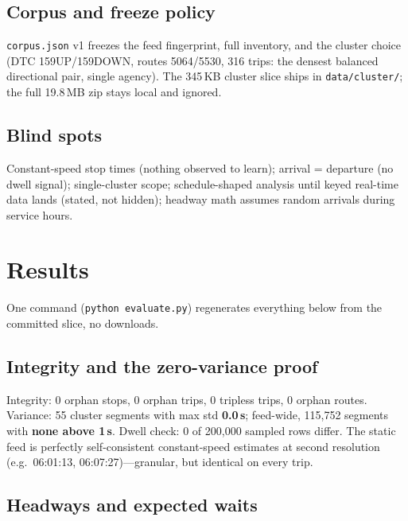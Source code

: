 \documentclass[11pt,a4paper]{article}
\begin{document}
\subsection{Corpus and freeze policy}

\verb!corpus.json! v1 freezes the feed fingerprint, full inventory, and the cluster choice (DTC 159UP/159DOWN, routes 5064/5530, 316 trips: the densest balanced directional pair, single agency). The 345\,KB cluster slice ships in \verb!data/cluster/!; the full 19.8\,MB zip stays local and ignored.

\subsection{Blind spots}

Constant-speed stop times (nothing observed to learn); arrival = departure (no dwell signal); single-cluster scope; schedule-shaped analysis until keyed real-time data lands (stated, not hidden); headway math assumes random arrivals during service hours.

\section{Results}
\label{sec:results}

One command (\verb!python evaluate.py!) regenerates everything below from the committed slice, no downloads.

\subsection{Integrity and the zero-variance proof}

Integrity: 0 orphan stops, 0 orphan trips, 0 tripless trips, 0 orphan routes. Variance: 55 cluster segments with max std \textbf{0.0\,s}; feed-wide, 115,752 segments with \textbf{none above 1\,s}. Dwell check: 0 of 200,000 sampled rows differ. The static feed is perfectly self-consistent constant-speed estimates at second resolution (e.g.\ 06:01:13, 06:07:27)---granular, but identical on every trip.

\subsection{Headways and expected waits}
\end{document}
